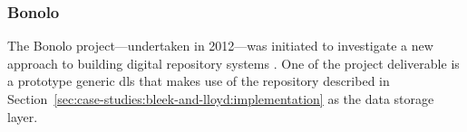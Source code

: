 \subsubsection{Bonolo}
\label{sec:case-studies:bleek-and-lloyd:use-cases:bonolo}

The Bonolo project---undertaken in 2012---was initiated to investigate a new approach to building digital repository systems \citep{Hammer2011}. One of the project deliverable is a prototype generic \gls{dls} \citep{Hammer2011, Phiri2012a} that makes use of the repository described in Section~\ref{sec:case-studies:bleek-and-lloyd:implementation} as the data storage layer.